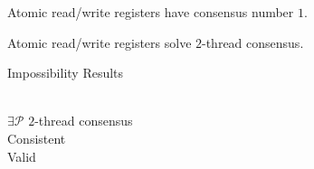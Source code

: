 \begin{frame}{}
  \begin{columns}
      \pause
  \end{columns}
\end{frame}

\begin{frame}{}
  \begin{theorem}
    Atomic read/write registers have consensus number $1$.
  \end{theorem}

  \pause
  \vspace{0.50cm}

  \begin{theorem}
    Atomic read/write registers  solve $2$-thread consensus.
  \end{theorem}
\end{frame}

\begin{frame}{}
  \centerline{\LARGE Impossibility Results}

  \pause
  \vspace{0.60cm}
  \begin{center}
    {\Large {}}  \\[8pt]

    {\Large $\exists \mathcal{P}$  $2$-thread consensus}  \\[25pt]

    \pause
    {\Large Consistent} \\[10pt]

    {\Large Valid}  \\[10pt]

    {\Large {}}  \\[6pt]

  \end{center}
\end{frame}
